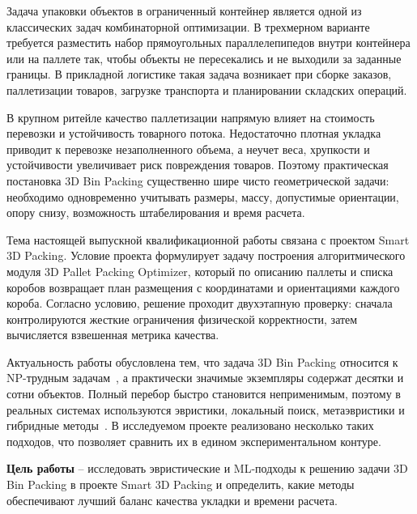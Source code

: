 
Задача упаковки объектов в ограниченный контейнер является одной из классических задач комбинаторной оптимизации. В трехмерном варианте требуется разместить набор прямоугольных параллелепипедов внутри контейнера или на паллете так, чтобы объекты не пересекались и не выходили за заданные границы. В прикладной логистике такая задача возникает при сборке заказов, паллетизации товаров, загрузке транспорта и планировании складских операций.

В крупном ритейле качество паллетизации напрямую влияет на стоимость перевозки и устойчивость товарного потока. Недостаточно плотная укладка приводит к перевозке незаполненного объема, а неучет веса, хрупкости и устойчивости увеличивает риск повреждения товаров. Поэтому практическая постановка 3D Bin Packing существенно шире чисто геометрической задачи: необходимо одновременно учитывать размеры, массу, допустимые ориентации, опору снизу, возможность штабелирования и время расчета.

Тема настоящей выпускной квалификационной работы связана с проектом Smart 3D Packing. Условие проекта формулирует задачу построения алгоритмического модуля 3D Pallet Packing Optimizer, который по описанию паллеты и списка коробов возвращает план размещения с координатами и ориентациями каждого короба. Согласно условию, решение проходит двухэтапную проверку: сначала контролируются жесткие ограничения физической корректности, затем вычисляется взвешенная метрика качества.

Актуальность работы обусловлена тем, что задача 3D Bin Packing относится к NP-трудным задачам~\cite{martello2000}, а практически значимые экземпляры содержат десятки и сотни объектов. Полный перебор быстро становится неприменимым, поэтому в реальных системах используются эвристики, локальный поиск, метаэвристики и гибридные методы~\cite{faroe2003,pisinger2010}. В исследуемом проекте реализовано несколько таких подходов, что позволяет сравнить их в едином экспериментальном контуре.

\textbf{Цель работы} -- исследовать эвристические и ML-подходы к решению задачи 3D Bin Packing в проекте Smart 3D Packing и определить, какие методы обеспечивают лучший баланс качества укладки и времени расчета.

